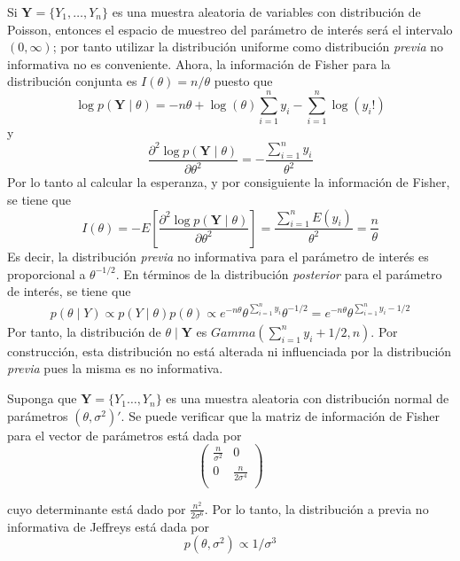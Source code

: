 \begin{Eje}
\label{EjemPoisson}
Si $\mathbf{Y}=\{Y_1,\ldots,Y_n\}$ es una muestra aleatoria de variables con distribución de Poisson, entonces el espacio de muestreo del parámetro de interés será el intervalo $(0,\infty)$; por tanto utilizar la distribución uniforme como distribución \emph{previa} no informativa no es conveniente. Ahora, la información de Fisher para la distribución conjunta es $I(\theta)=n/\theta$ puesto que
\begin{equation*}
\log p(\mathbf{Y} \mid \theta)=-n\theta+\log(\theta)\sum_{i=1}^ny_i-\sum_{i=1}^n\log(y_i!)
\end{equation*}
y
\begin{equation*}
\frac{\partial^2 \log p(\mathbf{Y} \mid \theta)}{\partial\theta^2}=-\frac{\sum_{i=1}^ny_i}{\theta^2}
\end{equation*}
Por lo tanto al calcular la esperanza, y por consiguiente la información de Fisher, se tiene que
\begin{equation*}
I(\theta)=- E\left[\frac{\partial^2 \log p(\mathbf{Y} \mid \theta)}{\partial\theta^2}\right]
=\frac{\sum_{i=1}^nE(y_i)}{\theta^2}=\frac{n}{\theta}
\end{equation*}
Es decir, la distribución \emph{previa} no informativa para el parámetro de interés es proporcional a $\theta^{-1/2}$. En términos de la distribución \emph{posterior} para el parámetro de interés, se tiene que
\begin{align*}
p(\theta \mid Y) \propto p(Y \mid \theta) p(\theta) \propto e^{-n\theta} \theta^{\sum_{i=1}^ny_i}\theta^{-1/2}
=e^{-n\theta} \theta^{\sum_{i=1}^ny_i-1/2}
\end{align*}
Por tanto, la distribución de $\theta \mid \mathbf{Y}$ es $Gamma(\sum_{i=1}^ny_i+1/2,n)$. Por construcción, esta distribución no está alterada ni influenciada por la distribución \emph{previa} pues la misma es no informativa.
\end{Eje}

\begin{Eje}
Suponga que $\mathbf{Y}=\{Y_1\ldots, Y_n\}$ es una muestra aleatoria con distribución normal de parámetros $(\theta, \sigma^2)'$. Se puede verificar que la matriz de información de Fisher para el vector de parámetros está dada por
\begin{equation}
\begin{pmatrix}
  \frac{n}{\sigma^2} & 0 \\
  0 & \frac{n}{2\sigma^4} \\
\end{pmatrix}
\end{equation}

cuyo determinante está dado por $\frac{n^2}{2\sigma^6}$. Por lo tanto, la distribución a previa no informativa de Jeffreys está dada por
\begin{equation}
p(\theta,\sigma^2)\propto 1/\sigma^3
\end{equation}
\end{Eje}

